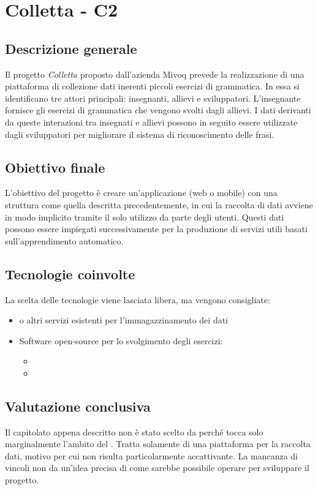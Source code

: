 \section{Colletta - C2} \label{c2}
    \subsection{Descrizione generale}
    Il progetto \textit{Colletta} proposto dall'azienda Mivoq prevede la realizzazione di una piattaforma di collezione dati inerenti piccoli esercizi di grammatica.
    In essa si identificano tre attori principali: insegnanti, allievi e sviluppatori. L'insegnante fornisce gli esercizi di grammatica che vengono svolti dagli allievi.
    I dati derivanti da queste interazioni tra insegnati e allievi possono in seguito essere utilizzate dagli sviluppatori per migliorare il sistema di riconoscimento delle frasi.

    \subsection{Obiettivo finale}
    L'obiettivo del progetto è creare un'applicazione (web o mobile) con una struttura come quella descritta precedentemente,
    in cui la raccolta di dati avviene in modo implicito tramite il solo utilizzo da parte degli utenti. Questi dati possono essere impiegati successivamente per la produzione di
    servizi utili basati sull'apprendimento automatico.

    \subsection{Tecnologie coinvolte}
    La scelta delle tecnologie viene lasciata libera, ma vengono consigliate:
        \begin{itemize}
            \item {} o altri servizi esistenti per l'immagazzinamento dei dati
            \item Software open-source per lo svolgimento degli esercizi:
            \begin{itemize}
                \item {} 
                \item {}
            \end{itemize}
        \end{itemize}

    \subsection{Valutazione conclusiva}
    Il capitolato appena descritto non è stato scelto da \gruppo perché tocca solo marginalmente l'ambito del .
    Tratta solamente di una piattaforma per la raccolta dati, motivo per cui non risulta particolarmente accattivante.
    La mancanza di vincoli non da un'idea precisa di come sarebbe possibile operare per sviluppare il progetto.

